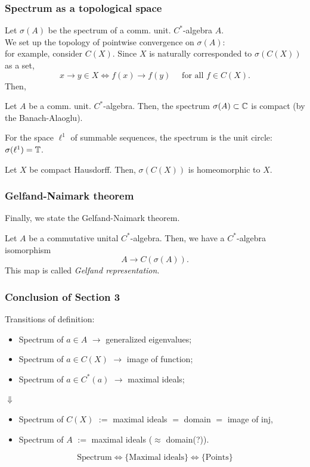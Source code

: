 \documentclass[10pt]{beamer}
\begin{document}
\begin{frame}
\frametitle{Spectrum as a topological space}
  Let $\sigma(A)$ be the spectrum of a comm. unit. $C^*$-algebra $A$.\\
  \bigskip
  \pause We set up the topology of pointwise convergence on $\sigma(A)$:\\for example, consider $C(X)$.
  Since $X$ is naturally corresponded to $\sigma(C(X))$ as a set,
  \[x\to y\in X \iff f(x)\to f(y)\quad\text{ for all }f\in C(X).\]
  \pause
  Then,
  \begin{prop}
    Let $A$ be a comm. unit. $C^*$-algebra.
    Then, the spectrum $\sigma(A)\subset\mathbb{C}$ is compact (by the Banach-Alaoglu).
  \end{prop}
  \pause
  \begin{ex}
    For the space $\ell^1$ of summable sequences, the spectrum is the unit circle: $\sigma(\ell^1)=\mathbb{T}$.
  \end{ex}
  \begin{ex}
    Let $X$ be compact Hausdorff. Then, $\sigma(C(X))$ is homeomorphic to $X$.
  \end{ex}
\end{frame}

\begin{frame}
\frametitle{Gelfand-Naimark theorem}
  Finally, we state the Gelfand-Naimark theorem. \pause
  \begin{thm}
    Let $A$ be a commutative unital $C^*$-algebra.
    Then, we have a $C^*$-algebra isomorphism
    \[A\to C(\sigma(A)).\]
    This map is called \emph{Gelfand representation}.
  \end{thm}
\end{frame}

\begin{frame}
\frametitle{Conclusion of Section 3}
  Transitions of definition:
  \begin{itemize}
    \item Spectrum of $a\in A$ $\to$ generalized eigenvalues;
    \item Spectrum of $a\in C(X)$ $\to$ image of function;
    \item Spectrum of $a\in C^*(a)$ $\to$ maximal ideals;
  \end{itemize}
  \hspace{10em}$\Downarrow$
  \begin{itemize}
    \item Spectrum of $C(X)$ $:=$ maximal ideals $=$ domain $=$ image of inj,\\
    \item Spectrum of $A$ $:=$ maximal ideals ($\approx$ domain(?)).
  \end{itemize}
  \bigskip
  \[\text{Spectrum}\iff\{\text{Maximal ideals}\}\iff\{\text{Points}\}\]
\end{frame}
\end{document}
